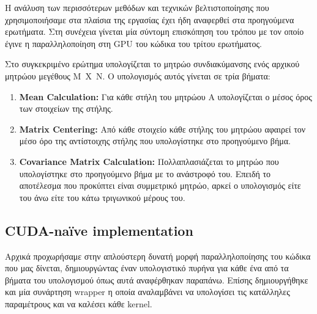 \noindent Η ανάλυση των περισσότερων μεθόδων και τεχνικών βελτιστοποίησης που χρησιμοποιήσαμε στα πλαίσια της εργασίας έχει ήδη αναφερθεί στα προηγούμενα ερωτήματα. Στη συνέχεια γίνεται μία σύντομη επισκόπηση του τρόπου με τον οποίο έγινε η παραλληλοποίηση στη GPU του κώδικα του τρίτου ερωτήματος. 

\noindent Στο συγκεκριμένο ερώτημα υπολογίζεται το μητρώο συνδιακύμανσης ενός αρχικού μητρώου μεγέθους \mbox{M X N}. Ο υπολογισμός αυτός γίνεται σε τρία βήματα:

\begin{enumerate}
    \item \textbf{Mean Calculation:} Για κάθε στήλη του μητρώου Α υπολογίζεται ο μέσος όρος των στοιχείων της στήλης.
    
    \item \textbf{Matrix Centering:} Από κάθε στοιχείο κάθε στήλης του μητρώου αφαιρεί τον μέσο όρο της αντίστοιχης στήλης που υπολογίστηκε στο προηγούμενο βήμα.
    
    \item \textbf{Covariance Matrix Calculation:} Πολλαπλασιάζεται το μητρώο που υπολογίστηκε στο προηγούμενο βήμα με το ανάστροφό του. Επειδή το αποτέλεσμα που προκύπτει είναι συμμετρικό μητρώο, αρκεί ο υπολογισμός είτε του άνω είτε του κάτω τριγωνικού μέρους του.
    
    
\end{enumerate}

\subsection*{CUDA-naïve implementation}

\noindent Αρχικά προχωρήσαμε στην απλούστερη δυνατή μορφή παραλληλοποίησης του κώδικα που μας δίνεται, δημιουργώντας έναν υπολογιστικό πυρήνα για κάθε ένα από τα βήματα του υπολογισμού όπως αυτά αναφέρθηκαν παραπάνω. Επίσης δημιουργήθηκε και μία συνάρτηση wrapper η οποία αναλαμβάνει να υπολογίσει τις κατάλληλες παραμέτρους και να καλέσει κάθε kernel.

